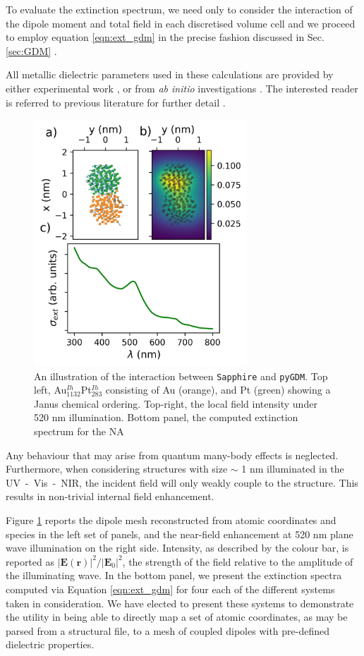To evaluate the extinction spectrum,  we need only to consider the interaction of the dipole moment and total field in each discretised volume cell and we proceed to employ equation \ref{eqn:ext_gdm} in the precise fashion discussed in Sec. \ref{sec:GDM} .

All metallic dielectric parameters used in these calculations are provided by either experimental work \cite{PhysRevB.6.4370,Rakic:98,PhysRevB.15.4115}, or from \textit{ab initio} investigations \cite{doi:10.1063/1.3243762}.
%
The interested reader is referred to previous literature for further detail \cite{GDM,pyGDM,pyGDMarXiv}.
%

\begin{figure}[ht!]
    \centering
    \includegraphics[width=8cm]{figures/Sapphire/Faraday_Light.jpeg}
    \caption{An illustration of the interaction between \texttt{Sapphire} and \texttt{pyGDM}. Top left, Au$_{1132}^{Ih}$Pt$_{283}^{Ih}$ consisting of Au (orange), and Pt (green) showing a Janus chemical ordering. Top-right, the local field intensity under 520 nm illumination. Bottom panel, the computed extinction spectrum for the NA}
    \label{fig:light}
\end{figure}

Any behaviour that may arise from quantum many-body effects is neglected.
Furthermore, when considering structures with size $\sim$ 1 nm illuminated in the UV~-~Vis~-~NIR, the incident field will only weakly couple to the structure. 
This results in non-trivial internal field enhancement.

Figure \ref{fig:light} reports the dipole mesh reconstructed from atomic coordinates and species in the left set of panels, and the near-field enhancement at 520 nm plane wave illumination on the right side. Intensity, as described by the colour bar, is reported as $|\mathbf{E}\left(\mathbf{r}\right)|^{2}/|\mathbf{E}_{0}|^{2}$, the strength of the field relative to the amplitude of the illuminating wave.
In the bottom panel, we present the extinction spectra computed via Equation \ref{eqn:ext_gdm} for four each of the different systems taken in consideration.
%
We have elected to present these systems to demonstrate the utility in being able to directly map a set of atomic coordinates, as may be parsed from a structural file, to a mesh of coupled dipoles with pre-defined dielectric properties. 

